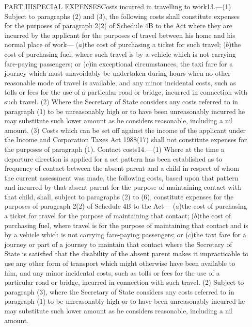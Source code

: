 \documentclass[a4paper]{article}
\begin{document}
PART IIISPECIAL EXPENSESCosts incurred in travelling to work13.—(1) Subject to
paragraphs (2) and (3), the following costs shall constitute expenses for the
purposes of paragraph 2(2) of Schedule 4B to the Act where they are incurred by
the applicant for the purposes of travel between his home and his normal place
of work—
($a$)the cost of purchasing a ticket for such travel;
($b$)the cost of purchasing fuel, where such travel is by a vehicle which is not
carrying fare-paying passengers; or
($c$)in exceptional circumstances, the taxi fare for a journey which must
unavoidably be undertaken during hours when no other reasonable mode of travel
is available,
and any minor incidental costs, such as tolls or fees for the use of a
particular road or bridge, incurred in connection with such travel.
(2) Where the Secretary of State considers any costs referred to in paragraph
(1) to be unreasonably high or to have been unreasonably incurred he may
substitute such lower amount as he considers reasonable, including a nil amount.
(3) Costs which can be set off against the income of the applicant under the
Income and Corporation Taxes Act 1988(17) shall not constitute expenses for the
purposes of paragraph (1).
Contact costs14.—(1) Where at the time a departure direction is applied for a
set pattern has been established as to frequency of contact between the absent
parent and a child in respect of whom the current assessment was made, the
following costs, based upon that pattern and incurred by that absent parent for
the purpose of maintaining contact with that child, shall, subject to paragraphs
(2) to (6), constitute expenses for the purposes of paragraph 2(2) of Schedule
4B to the Act—
($a$)the cost of purchasing a ticket for travel for the purpose of maintaining
that contact;
($b$)the cost of purchasing fuel, where travel is for the purpose of maintaining
that contact and is by a vehicle which is not carrying fare-paying passengers;
or
($c$)the taxi fare for a journey or part of a journey to maintain that contact
where the Secretary of State is satisfied that the disability of the absent
parent makes it impracticable to use any other form of transport which might
otherwise have been available to him,
and any minor incidental costs, such as tolls or fees for the use of a
particular road or bridge, incurred in connection with such travel.
(2) Subject to paragraph (3), where the Secretary of State considers any costs
referred to in paragraph (1) to be unreasonably high or to have been
unreasonably incurred he may substitute such lower amount as he considers
reasonable, including a nil amount.
\end{document}
